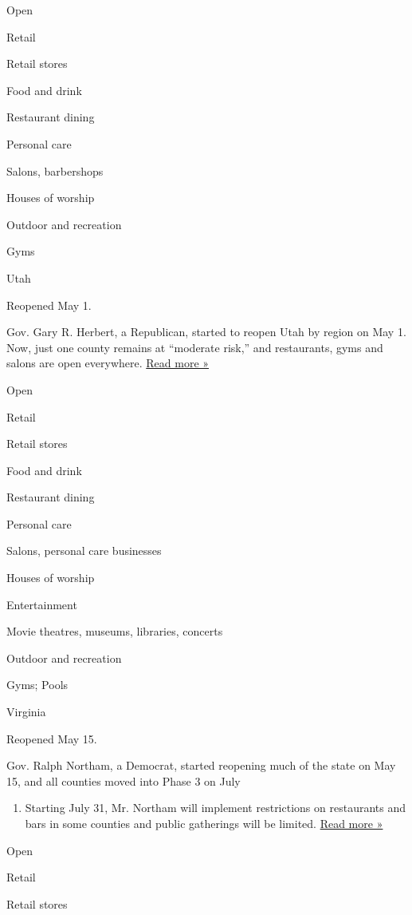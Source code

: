 Open

Retail

Retail stores

Food and drink

Restaurant dining

Personal care

Salons, barbershops

Houses of worship

Outdoor and recreation

Gyms

Utah

Reopened May 1.

Gov. Gary R. Herbert, a Republican, started to reopen Utah by region on
May 1. Now, just one county remains at ``moderate risk,'' and
restaurants, gyms and salons are open everywhere.
\href{https://www.sltrib.com/news/2020/04/28/utah-will-begin-easing/}{Read
more »}

Open

Retail

Retail stores

Food and drink

Restaurant dining

Personal care

Salons, personal care businesses

Houses of worship

Entertainment

Movie theatres, museums, libraries, concerts

Outdoor and recreation

Gyms; Pools

Virginia

Reopened May 15.

Gov. Ralph Northam, a Democrat, started reopening much of the state on
May 15, and all counties moved into Phase 3 on July

\begin{enumerate}
\def\labelenumi{\arabic{enumi}.}
\tightlist
\item
  Starting July 31, Mr. Northam will implement restrictions on
  restaurants and bars in some counties and public gatherings will be
  limited.
  \href{https://www.wsls.com/news/2020/06/30/bar-seating-will-be-prohibited-in-virginia-restaurants-during-phase-3-gov-northam-says/}{Read
  more »}
\end{enumerate}

Open

Retail

Retail stores

